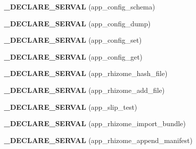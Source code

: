 \begin{DoxyCompactItemize}
\item 
\hypertarget{serval-client_8c_a3ebbc11c0cab167980c308abf6795508}{{\bfseries \-\_\-\-D\-E\-C\-L\-A\-R\-E\-\_\-\-S\-E\-R\-V\-A\-L} (app\-\_\-config\-\_\-schema)}\label{serval-client_8c_a3ebbc11c0cab167980c308abf6795508}

\item 
\hypertarget{serval-client_8c_a0518b444ccb2917eec756f4865e8061b}{{\bfseries \-\_\-\-D\-E\-C\-L\-A\-R\-E\-\_\-\-S\-E\-R\-V\-A\-L} (app\-\_\-config\-\_\-dump)}\label{serval-client_8c_a0518b444ccb2917eec756f4865e8061b}

\item 
\hypertarget{serval-client_8c_a940723c3f05e4bbdf8b44dd7092003bf}{{\bfseries \-\_\-\-D\-E\-C\-L\-A\-R\-E\-\_\-\-S\-E\-R\-V\-A\-L} (app\-\_\-config\-\_\-set)}\label{serval-client_8c_a940723c3f05e4bbdf8b44dd7092003bf}

\item 
\hypertarget{serval-client_8c_a1ce2db7eadecaeab827718f2fb2a66d4}{{\bfseries \-\_\-\-D\-E\-C\-L\-A\-R\-E\-\_\-\-S\-E\-R\-V\-A\-L} (app\-\_\-config\-\_\-get)}\label{serval-client_8c_a1ce2db7eadecaeab827718f2fb2a66d4}

\item 
\hypertarget{serval-client_8c_a4672c8eaed129d5f1b6005df47868ec0}{{\bfseries \-\_\-\-D\-E\-C\-L\-A\-R\-E\-\_\-\-S\-E\-R\-V\-A\-L} (app\-\_\-rhizome\-\_\-hash\-\_\-file)}\label{serval-client_8c_a4672c8eaed129d5f1b6005df47868ec0}

\item 
\hypertarget{serval-client_8c_ab9223643b41518d4087e8af485d5f922}{{\bfseries \-\_\-\-D\-E\-C\-L\-A\-R\-E\-\_\-\-S\-E\-R\-V\-A\-L} (app\-\_\-rhizome\-\_\-add\-\_\-file)}\label{serval-client_8c_ab9223643b41518d4087e8af485d5f922}

\item 
\hypertarget{serval-client_8c_a344436fe882a394053f7b6fc8e0cddd6}{{\bfseries \-\_\-\-D\-E\-C\-L\-A\-R\-E\-\_\-\-S\-E\-R\-V\-A\-L} (app\-\_\-slip\-\_\-test)}\label{serval-client_8c_a344436fe882a394053f7b6fc8e0cddd6}

\item 
\hypertarget{serval-client_8c_a417c19cf6452ab422d43d360828b43a5}{{\bfseries \-\_\-\-D\-E\-C\-L\-A\-R\-E\-\_\-\-S\-E\-R\-V\-A\-L} (app\-\_\-rhizome\-\_\-import\-\_\-bundle)}\label{serval-client_8c_a417c19cf6452ab422d43d360828b43a5}

\item 
\hypertarget{serval-client_8c_a59f5e765871538469a96868620d23b4c}{{\bfseries \-\_\-\-D\-E\-C\-L\-A\-R\-E\-\_\-\-S\-E\-R\-V\-A\-L} (app\-\_\-rhizome\-\_\-append\-\_\-manifest)}\label{serval-client_8c_a59f5e765871538469a96868620d23b4c}


\end{DoxyCompactItemize}
